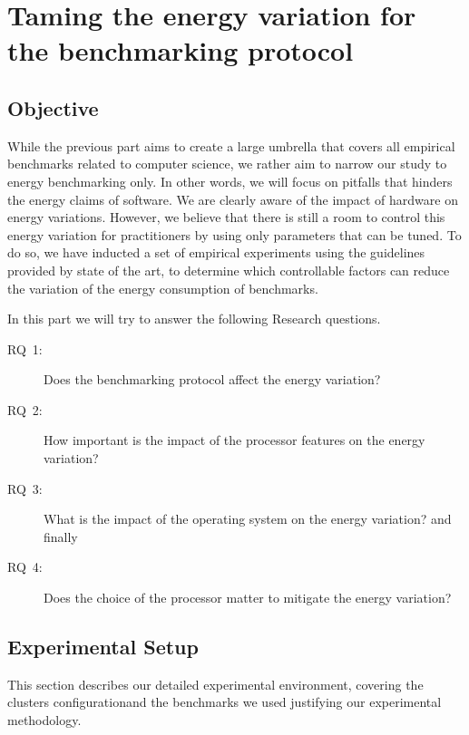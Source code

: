 



\section{Taming the energy variation for the benchmarking protocol}

\subsection{Objective}
While the previous part aims to create a large umbrella that covers all empirical benchmarks related to computer science, we rather aim to narrow our study to energy benchmarking only.
In other words, we will focus on pitfalls that hinders the energy claims of software.
We are clearly aware of the impact of hardware on energy variations.
However, we believe that there is still a room to control this energy variation for practitioners by using only parameters that can be tuned.
To do so, we have inducted a set of empirical experiments using the guidelines provided by state of the art, to determine which controllable factors can reduce the variation of the energy consumption of benchmarks.

In this part we will try to answer the following Research questions.

\begin{description}
    \item[\textsc{RQ}~1:] Does the benchmarking protocol affect the energy variation?
    \item[\textsc{RQ}~2:] How important is the impact of the processor features on the energy variation?
    \item[\textsc{RQ}~3:] What is the impact of the operating system on the energy variation? and finally
    \item[\textsc{RQ}~4:] Does the choice of the processor matter to mitigate the energy variation?
\end{description}


\subsection{Experimental Setup}\label{subsec:setup}
This section describes our detailed experimental environment, covering the clusters configurationand the benchmarks we used  justifying our experimental methodology.

